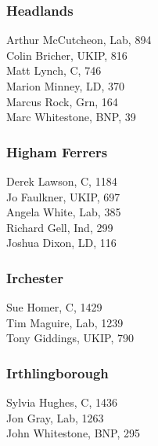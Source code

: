 \documentclass[a4paper,openany,10pt]{book}
\begin{document}
\subsubsection*{Headlands}



Arthur McCutcheon, Lab, 894\\
Colin Bricher, UKIP, 816\\
Matt Lynch, C, 746\\
Marion Minney, LD, 370\\
Marcus Rock, Grn, 164\\
Marc Whitestone, BNP, 39\\


\subsubsection*{Higham Ferrers}



Derek Lawson, C, 1184\\
Jo Faulkner, UKIP, 697\\
Angela White, Lab, 385\\
Richard Gell, Ind, 299\\
Joshua Dixon, LD, 116\\


\subsubsection*{Irchester}



Sue Homer, C, 1429\\
Tim Maguire, Lab, 1239\\
Tony Giddings, UKIP, 790\\


\subsubsection*{Irthlingborough}



Sylvia Hughes, C, 1436\\
Jon Gray, Lab, 1263\\
John Whitestone, BNP, 295\\
\end{document}
